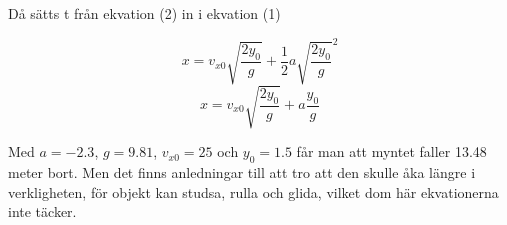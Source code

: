 \documentclass[a4paper,12pt]{article}
\begin{document}
\begin{enumerate}
            Då sätts t från ekvation (2) in i ekvation (1)

            $$x=v_{x0}\sqrt{\frac{2y_0}{g}} + \frac{1}{2}a\sqrt{\frac{2y_0}{g}}^2$$
            $$x=v_{x0}\sqrt{\frac{2y_0}{g}} + a\frac{y_0}{g}$$

            Med $a=-2.3$, $g=9.81$, $v_{x0}=25$ och $y_0=1.5$ får man att
            myntet faller 13.48 meter bort. Men det finns anledningar
            till att tro att den skulle åka längre i verkligheten, för
            objekt kan studsa, rulla och glida, vilket dom här
            ekvationerna inte täcker.

\end{enumerate}
\end{document}
